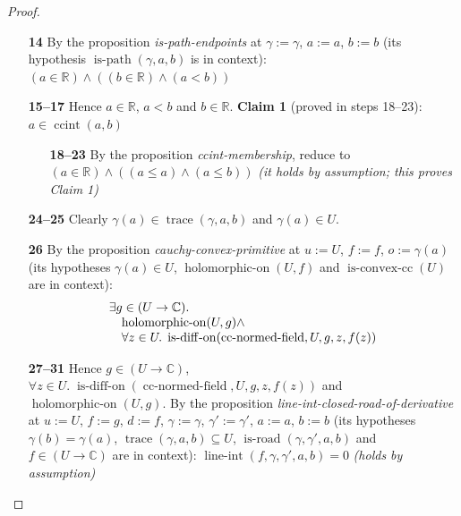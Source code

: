 \documentclass[11pt]{article}
\theoremstyle{plain}
\begin{document}
\begin{proof}
\begin{itemize}[leftmargin=2.8em, itemsep=4pt, parsep=1pt]
  \item[\textbf{14}] By the proposition \emph{is-path-endpoints} at $\gamma := \gamma$, $a := a$, $b := b$ (its hypothesis $\operatorname{is\text{-}path}(\gamma, a, b)$ is in context): $(a \in \mathbb{R}) \wedge ((b \in \mathbb{R}) \wedge (a < b))$
  \item[\textbf{15--17}] Hence $a \in \mathbb{R}$, $a < b$ and $b \in \mathbb{R}$. \textbf{Claim 1} (proved in steps 18--23): $a \in \operatorname{ccint}(a, b)$
  \begin{itemize}[leftmargin=2.8em, itemsep=4pt, parsep=1pt]
  \item[\textbf{18--23}] By the proposition \emph{ccint-membership}, reduce to $(a \in \mathbb{R}) \wedge ((a \leq a) \wedge (a \leq b))$  \emph{(it holds by assumption; this proves Claim 1)}
  \end{itemize}
  \item[\textbf{24--25}] Clearly $\gamma(a) \in \operatorname{trace}(\gamma, a, b)$ and $\gamma(a) \in U$.
  \item[\textbf{26}] By the proposition \emph{cauchy-convex-primitive} at $u := U$, $f := f$, $o := \gamma(a)$ (its hypotheses $\gamma(a) \in U$, $\operatorname{holomorphic\text{-}on}(U, f)$ and $\operatorname{is\text{-}convex\text{-}cc}(U)$ are in context):
\begin{equation*}
\begin{array}{@{}l@{}} \exists g \in (U \to \mathbb{C}). \\ \quad \operatorname{holomorphic\text{-}on}(U, g) \wedge \\ \quad \forall z \in U.\; \operatorname{is\text{-}diff\text{-}on}(\operatorname{cc\text{-}normed\text{-}field}, U, g, z, f(z)) \end{array}
\end{equation*}

  \item[\textbf{27--31}] Hence $g \in (U \to \mathbb{C})$, $\forall z \in U.\; \operatorname{is\text{-}diff\text{-}on}(\operatorname{cc\text{-}normed\text{-}field}, U, g, z, f(z))$ and $\operatorname{holomorphic\text{-}on}(U, g)$. By the proposition \emph{line-int-closed-road-of-derivative} at $u := U$, $f := g$, $d := f$, $\gamma := \gamma$, $\gamma' := \gamma'$, $a := a$, $b := b$ (its hypotheses $\gamma(b) = \gamma(a)$, $\operatorname{trace}(\gamma, a, b) \subseteq U$, $\operatorname{is\text{-}road}(\gamma, \gamma', a, b)$ and $f \in (U \to \mathbb{C})$ are in context): $\operatorname{line\text{-}int}(f, \gamma, \gamma', a, b) = 0$  \emph{(holds by assumption)}
\end{itemize}
\end{proof}
\end{document}
